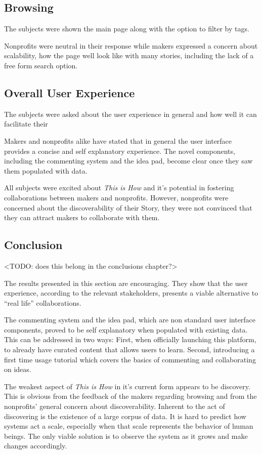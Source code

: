\subsection{Browsing}

The subjects were shown the main page along with the option to filter by tags.

Nonprofits were neutral in their response while makers expressed a concern about scalability, how the page well look like with many stories, including the lack of a free form search option.

\subsection{Overall User Experience}
The subjects were asked about the user experience in general and how well it can facilitate their  

Makers and nonprofits alike have stated that in general the user interface provides a concise and self explanatory experience. The novel components, including the commenting system and the idea pad, become clear once they saw them populated with data.     

All subjects were excited about \textit{This is How} and it's potential in fostering collaborations between makers and nonprofits. However, nonprofits were concerned about the discoverability of their Story, they were not convinced that they can attract makers to collaborate with them.     

\subsection{Conclusion}

<TODO: does this belong in the conclusions chapter?>

The results presented in this section are encouraging. They show that the user experience, according to the relevant stakeholders, presents a viable alternative to ``real life'' collaborations.

The commenting system and the idea pad, which are non standard user interface components, proved to be self explanatory when populated with existing data. This can be addressed in two ways: First, when officially launching this platform, to already have curated content that allows users to learn. Second, introducing a first time usage tutorial which covers the basics of commenting and collaborating on ideas.

The weakest aspect of \textit{This is How} in it's current form appears to be discovery. This is obvious from the feedback of the makers regarding browsing and from the nonprofits' general concern about discoverability. Inherent to the act of discovering is the existence of a large corpus of data. It is hard to predict how systems act a scale, especially when that scale represents the behavior of human beings. The only viable solution is to observe the system as it grows and make changes accordingly.